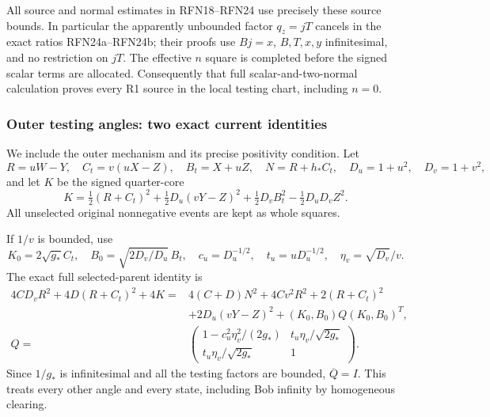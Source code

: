 All source and normal estimates in RFN18--RFN24 use precisely these
source bounds. In particular the apparently unbounded factor $q_z=jT$
cancels in the exact ratios RFN24a--RFN24b; their proofs use $Bj=x$,
$B,T,x,y$ infinitesimal, and no restriction on $jT$. The effective
$n$ square is completed before the signed scalar terms are allocated.
Consequently that full scalar-and-two-normal calculation proves every
R1 source in the local testing chart, including $n=0$.

\subsubsection*{Outer testing angles: two exact current identities}

We include the outer mechanism and its precise positivity condition.
Let
\[
 R=uW-Y,\quad C_t=v(uX-Z),\quad B_t=X+uZ,\quad
 N=R+h_*C_t,\quad D_u=1+u^2,\quad D_v=1+v^2,
\]
and let $K$ be the signed quarter-core
\[
 K=\tfrac12(R+C_t)^2+\tfrac12D_u(vY-Z)^2
             +\tfrac12D_v B_t^2-\tfrac12D_uD_vZ^2.       \tag{R1N12}
\]
All unselected original nonnegative events are kept as whole squares.

If $1/v$ is bounded, use
\[
 K_0=2\sqrt{g_*}C_t,\quad
 B_0=\sqrt{2D_v/D_u}\,B_t,\quad
 c_u=D_u^{-1/2},\quad t_u=uD_u^{-1/2},\quad
 \eta_v=\sqrt{D_v}/v .
\]
The exact full selected-parent identity is
\begin{align*}
 4CD_vR^2+4D(R+C_t)^2+4K
 ={}&4(C+D)N^2+4Cv^2R^2+2(R+C_t)^2\\
 &+2D_u(vY-Z)^2+(K_0,B_0)Q(K_0,B_0)^T,\\
 Q={}&
 \begin{pmatrix}
 1-c_u^2\eta_v^2/(2g_*)&t_u\eta_v/\sqrt{2g_*}\\
 t_u\eta_v/\sqrt{2g_*}&1
 \end{pmatrix}.
\tag{R1N13}
\end{align*}
Since $1/g_*$ is infinitesimal and all the testing factors are bounded,
$\overline Q=I$.  This treats every other angle and every state,
including Bob infinity by homogeneous clearing.

